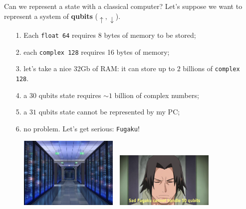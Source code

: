 \documentclass[aspectratio=169, 10pt, xcolor={svgnames}, hyperref={linkcolor=black}]{beamer}
\begin{document}
\begin{frame}{Can we represent a state with a classical computer?}
\pause
Let's suppose we want to represent a system of \textbf{qubits} ($\uparrow, \downarrow$).
\pause
\small
\begin{itemize}[noitemsep]
\item[1.] Each \texttt{float 64} requires 8 bytes of memory to be stored;
\pause
\item[2.] each \texttt{complex 128} requires 16 bytes of memory;
\pause
\item[3.] let's take a nice 32Gb of RAM: it can store up to $2$ billions of \texttt{complex 128}.
\pause
\item[4.] a $30$ qubits state requires $\sim 1$ billion of complex numbers;
\pause
\item[5.] a $31$ qubits state cannot be represented by my PC;
\pause
\item[6.] no problem. Let's get serious: \texttt{Fugaku}!
\end{itemize}

\begin{figure}
   \includegraphics[width=0.42\textwidth, height=0.4\textheight]{figures/fugaku.jpeg}%
   $\,\,$
   \pause
   \includegraphics[width=0.42\textwidth, height=0.4\textheight]{figures/sad_fugaku.jpg}
\end{figure}
\end{frame}
\end{document}

